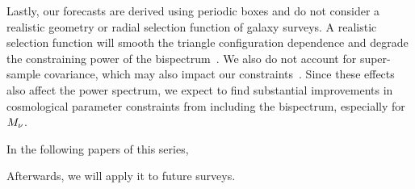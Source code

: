 Lastly, our forecasts are derived using periodic boxes and do not consider a
realistic geometry or radial selection function of galaxy surveys. A realistic 
selection function will smooth the triangle configuration dependence and degrade 
the constraining power of the bispectrum~\citep{sefusatti2005}. We also do not
account for super-sample covariance, which may also impact our
constraints~\citep{hamilton2006, sefusatti2006, takada2013, li2018, wadekar2019}. 
Since these effects also affect the power spectrum, we expect to find
substantial improvements in cosmological parameter constraints from including
the bispectrum, especially for $M_\nu$. 


In the following papers of this series, 

Afterwards, we will apply it to future surveys. 

